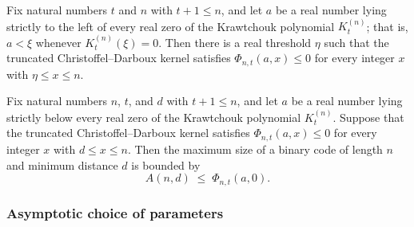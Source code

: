 \begin{theorem}
\label{cdKernel_nonpos_beyond_threshold}
Fix natural numbers $t$ and $n$ with $t + 1 \le n$, and let $a$ be a real number lying
strictly to the left of every real zero of the Krawtchouk polynomial $K_t^{(n)}$; that
is, $a < \xi$ whenever $K_t^{(n)}(\xi) = 0$. Then there is a real threshold $\eta$ such
that the truncated Christoffel--Darboux kernel satisfies $\Phi_{n,t}(a, x) \le 0$ for
every integer $x$ with $\eta \le x \le n$.
\end{theorem}

\begin{theorem}
\label{finite_n_mrrw_bound}
\leanok
{}
Fix natural numbers $n$, $t$, and $d$ with $t + 1 \le n$, and let $a$ be a real number
lying strictly below every real zero of the Krawtchouk polynomial $K_t^{(n)}$. Suppose
that the truncated Christoffel--Darboux kernel satisfies $\Phi_{n,t}(a, x) \le 0$ for
every integer $x$ with $d \le x \le n$. Then the maximum size of a binary code of length
$n$ and minimum distance $d$ is bounded by
\[
  A(n, d) \;\le\; \Phi_{n,t}(a, 0).
\]
\end{theorem}

\subsubsection{Asymptotic choice of parameters}

